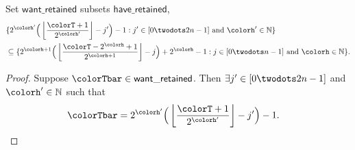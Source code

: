 \begin{sublemma}
\label{thm:tilted-subsetr}
Set $\mathsf{want\_retained}$ subsets $\mathsf{have\_retained}$,
\begin{align*}
&\{
  2^{\colorh'}\Big(\left\lfloor \frac{\colorT + 1}{2^{\colorh'}} \right\rfloor - j'\Big) - 1
  :
  j' \in [0 \twodots 2n-1]
  \text{ and }
  \colorh' \in \mathbb{N}
\}\\
&\subseteq
\{
  2^{\colorh + 1}\Big( \left\lfloor\frac{\colorT - 2^{\colorh} + 1}{2^{\colorh + 1}} \right\rfloor - j\Big) + 2^{\colorh} - 1
  :
  j \in [0 \twodots n-1]
  \text{ and }
  \colorh \in \mathbb{N}
\}.
\end{align*}

\end{sublemma}
\begin{proof}
Suppose $\colorTbar \in \mathsf{want\_retained}$.
Then $\exists j' \in [0 \twodots 2n - 1]$ and $\colorh' \in \mathbb{N}$ such that
\begin{align*}
\colorTbar
&= 2^{\colorh'}\Big(\left\lfloor \frac{\colorT + 1}{2^{\colorh'}} \right\rfloor - j'\Big) - 1.
\end{align*}


\end{proof}
